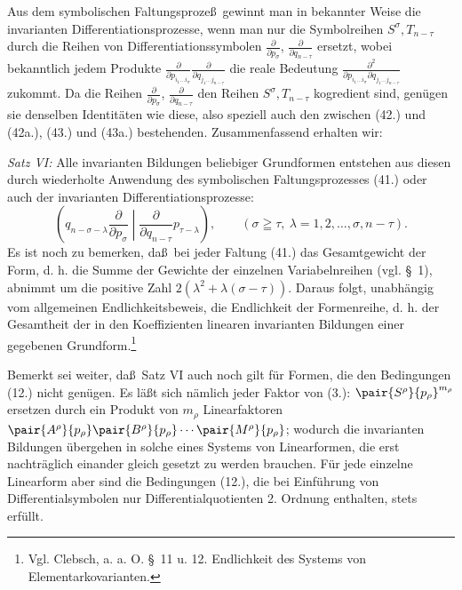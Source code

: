 Aus dem symbolischen Faltungsproze\ss\ gewinnt man in bekannter Weise die invarianten Differentiationsprozesse, wenn man nur die Symbolreihen $S^\sigma,T_{n-\tau}$ durch die Reihen von Differentiationssymbolen $\frac{\partial}{\partial p_\sigma}$, $\frac{\partial}{\partial q_{n-\tau}}$ ersetzt, wobei bekanntlich jedem Produkte $\frac{\partial}{\partial p_{i_1\ldots i_\sigma}}\frac{\partial}{\partial q_{j_1\ldots j_{n-\tau}}}$ die reale Bedeutung $\frac{\partial^2}{\partial p_{i_1\ldots i_\sigma}\partial q_{j_1\ldots j_{n-\tau}}}$ zukommt. Da die Reihen $\frac{\partial}{\partial p_\sigma}$, $\frac{\partial}{\partial q_{n-\tau}}$ den Reihen $S^\sigma,T_{n-\tau}$ kogredient sind, gen\"ugen sie denselben Identit\"aten wie diese, also speziell auch den zwischen (42.) und (42a.), (43.) und (43a.) bestehenden. Zusammenfassend erhalten wir:

\emph{Satz VI:} Alle invarianten Bildungen beliebiger Grundformen entstehen aus diesen durch wiederholte Anwendung des symbolischen Faltungsprozesses (41.) oder auch der invarianten Differentiationsprozesse:
\begin{equation}
 \left(q_{n-\sigma-\lambda}\frac{\partial}{\partial p_\sigma}\middle|\frac{\partial}{\partial q_{n-\tau}}p_{\tau-\lambda}\right),
 \qquad(\sigma\geqq\tau,\ \lambda=1,2,\ldots,\sigma,n-\tau).
\tag{45}
\end{equation}
Es ist noch zu bemerken, da\ss\ bei jeder Faltung (41.) das Gesamtgewicht der Form, d. h. die Summe der Gewichte der einzelnen Variabelnreihen (vgl. \S\ 1), abnimmt um die positive Zahl $2(\lambda^2+\lambda(\sigma-\tau))$. Daraus folgt, unabh\"angig vom allgemeinen Endlichkeitsbeweis, die Endlichkeit der Formenreihe, d. h. der Gesamtheit der in den Koeffizienten linearen invarianten Bildungen einer gegebenen Grundform.\footnote{Vgl. Clebsch, a. a. O. \S\ 11 u. 12. Endlichkeit des Systems von Elementarkovarianten.}

Bemerkt sei weiter, da\ss\ Satz VI auch noch gilt f\"ur Formen, die den Bedingungen (12.) nicht gen\"ugen. Es l\"a\ss t sich n\"amlich jeder Faktor von (3.): $\pair{S^\rho}{p_\rho}^{m_\rho}$ ersetzen durch ein Produkt von $m_\rho$ Linearfaktoren $\pair{A^\rho}{p_\rho}\pair{B^\rho}{p_\rho}\cdots\pair{M^\rho}{p_\rho}$; wodurch die invarianten Bildungen \"ubergehen in solche eines Systems von Linearformen, die erst nachtr\"aglich einander gleich gesetzt zu werden brauchen. F\"ur jede einzelne Linearform aber sind die Bedingungen (12.), die bei Einf\"uhrung von Differentialsymbolen nur Differentialquotienten 2. Ordnung enthalten, stets erf\"ullt.

